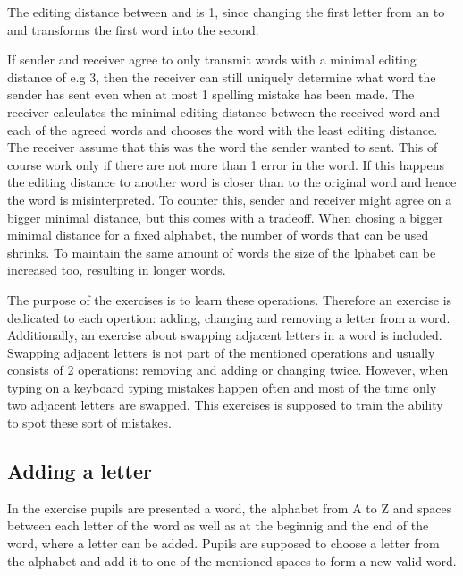 \begin{example}
    The editing distance between  and  is 1, since changing the first letter from an  to and  transforms the first word into the second.
\end{example}

If sender and receiver agree to only transmit words with a minimal editing distance of e.g 3, then the receiver can still uniquely determine what word the sender has sent even when at most 1 spelling mistake has been made. The receiver calculates the minimal editing distance between the received word and each of the agreed words and chooses the word with the least editing distance.
The receiver assume that this was the word the sender wanted to sent. This of course work only if there are not more than 1 error in the word. If this happens the editing distance to another word is closer than to the original word and hence the word is misinterpreted. To counter this, sender and receiver might agree on a bigger minimal distance, but this comes with a tradeoff. When chosing a bigger minimal distance for a fixed alphabet, the number of words that can be used shrinks. To maintain the same amount of words the size of the lphabet can be increased too, resulting in longer words.

The purpose of the  exercises is to learn these operations. Therefore an exercise is dedicated to each opertion: adding, changing and removing a letter from a word. Additionally, an exercise about swapping adjacent letters in a word is included. Swapping adjacent letters is not part of the mentioned operations and usually consists of 2 operations: removing and adding or changing twice. However, when typing on a keyboard typing mistakes happen often and most of the time only two adjacent letters are swapped. This exercises is supposed to train the ability to spot these sort of mistakes.

\subsection*{Adding a letter}

In the  exercise pupils are presented a word, the alphabet from A to Z and spaces between each letter of the word as well as at the beginnig and the end of the word, where a letter can be added. Pupils are supposed to choose a letter from the alphabet and add it to one of the mentioned spaces to form a new valid word.

